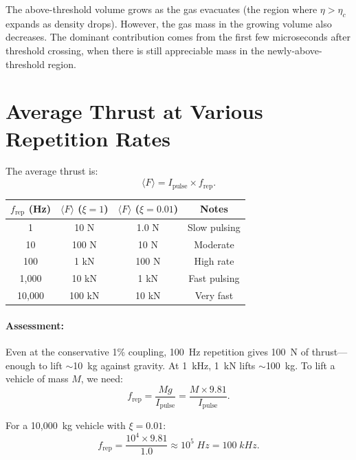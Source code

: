 \documentclass[amsmath,amssymb,aps,prd,superscriptaddress,nofootinbib]{revtex4-2}
\newcommand{\etac}{\eta_c}
\begin{document}
The above-threshold volume grows as the gas evacuates (the region where
$\eta > \etac$ expands as density drops). However, the gas mass in the
growing volume also decreases. The dominant contribution comes from the
first few microseconds after threshold crossing, when there is still
appreciable mass in the newly-above-threshold region.

\section{Average Thrust at Various Repetition Rates}\label{sec:thrust}

The average thrust is:
\begin{equation}
\langle F \rangle = I_\text{pulse} \times f_\text{rep}.
\end{equation}

\begin{center}
\begin{tabular}{cccc}
\toprule
$f_\text{rep}$ (Hz) & $\langle F \rangle$ ($\xi = 1$) & $\langle F \rangle$ ($\xi = 0.01$) & Notes \\
\midrule
1 & 10 N & 1.0 N & Slow pulsing \\
10 & 100 N & 10 N & Moderate \\
100 & 1 kN & 100 N & High rate \\
1{,}000 & 10 kN & 1 kN & Fast pulsing \\
10{,}000 & 100 kN & 10 kN & Very fast \\
\bottomrule
\end{tabular}
\end{center}

\paragraph{Assessment:} Even at the conservative 1\% coupling, 100~Hz
repetition gives 100~N of thrust---enough to lift $\sim$10~kg against
gravity. At 1~kHz, 1~kN lifts $\sim$100~kg. To lift a vehicle of mass
$M$, we need:
\begin{equation}
f_\text{rep} = \frac{Mg}{I_\text{pulse}}
= \frac{M \times 9.81}{I_\text{pulse}}.
\end{equation}

For a 10{,}000~kg vehicle with $\xi = 0.01$:
\begin{equation}
f_\text{rep} = \frac{10^4 \times 9.81}{1.0} \approx 10^5 \; \si{Hz} = 100 \; \si{kHz}.
\end{equation}
\end{document}
